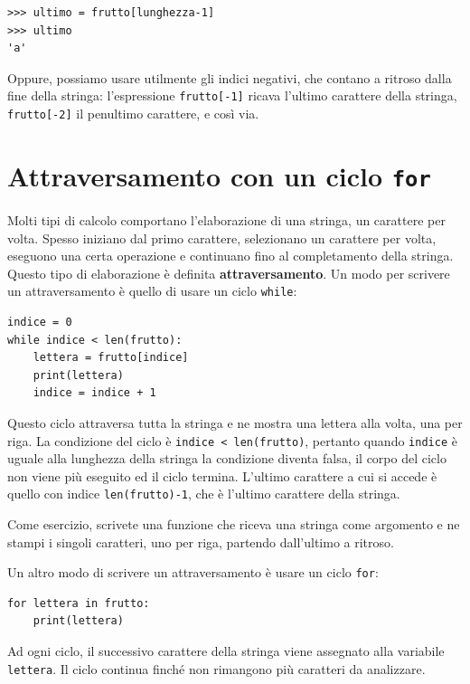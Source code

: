 \documentclass[10pt]{book}
\begin{document}
\begin{verbatim}
>>> ultimo = frutto[lunghezza-1]
>>> ultimo
'a'
\end{verbatim}
%
Oppure, possiamo usare utilmente gli indici negativi, che contano a ritroso dalla fine della stringa: l'espressione {\tt frutto[-1]} ricava l'ultimo carattere della stringa, {\tt frutto[-2]} il penultimo carattere, e così via.


\section{Attraversamento con un ciclo {\tt for}}
\label{for}

Molti tipi di calcolo comportano l'elaborazione di una stringa, un carattere per volta. Spesso iniziano dal primo carattere, selezionano un carattere per volta, eseguono una certa operazione e continuano fino al completamento della stringa. Questo tipo di elaborazione è definita {\bf attraversamento}. Un modo per scrivere un attraversamento è quello di usare un ciclo {\tt while}:

\begin{verbatim}
indice = 0
while indice < len(frutto):
    lettera = frutto[indice]
    print(lettera)
    indice = indice + 1
\end{verbatim}
%
Questo ciclo attraversa tutta la stringa e ne mostra una lettera alla volta,    una per riga. La condizione del ciclo è {\tt indice < len(frutto)}, pertanto   quando {\tt indice} è uguale alla lunghezza della stringa la condizione diventa falsa, il corpo del ciclo non viene più eseguito ed il ciclo termina. L'ultimo carattere a cui si accede è quello con indice {\tt len(frutto)-1}, che è l'ultimo carattere della stringa.

Come esercizio, scrivete una funzione che riceva una stringa come argomento e ne stampi i singoli caratteri, uno per riga, partendo dall'ultimo a ritroso.

Un altro modo di scrivere un attraversamento è usare un ciclo {\tt for}:

\begin{verbatim}
for lettera in frutto:
    print(lettera)
\end{verbatim}
%
Ad ogni ciclo, il successivo carattere della stringa viene assegnato alla variabile {\tt lettera}. Il ciclo continua finché non rimangono più caratteri da analizzare.
\end{document}

